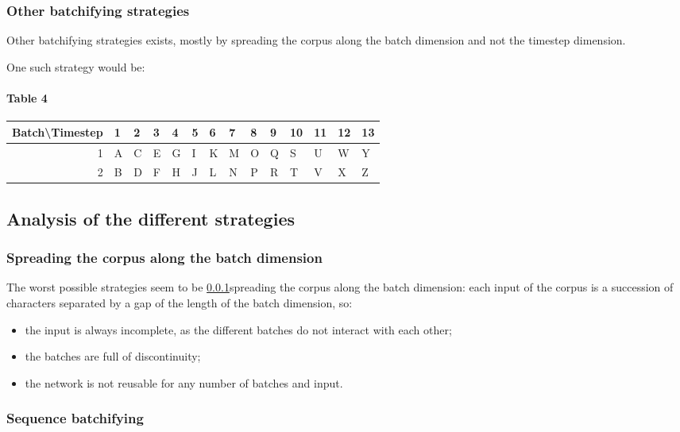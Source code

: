 \subsubsection{Other batchifying strategies}\label{table 4}

Other batchifying strategies exists, mostly by spreading the corpus along the batch dimension and not the timestep dimension.

One such strategy would be:

\paragraph{Table 4}
\begin{tabular}[]{|r|lllllllllllll|}
	\hline
	Batch\textbackslash Timestep & 1 & 2 & 3 & 4 & 5 & 6 & 7 & 8 & 9 & 10 & 11 & 12 &
	13\\
	\hline
	1 & A & C & E & G & I & K & M & O & Q & S & U & W & Y\\
	2 & B & D & F & H & J & L & N & P & R & T & V & X & Z\\
	\hline
\end{tabular}

\subsection{Analysis of the different
strategies}

\subsubsection{Spreading the corpus along the batch
dimension}

The worst possible strategies seem to be
\ref{table 4}{spreading
the corpus along the batch dimension}: each input of the corpus is a
succession of characters separated by a gap of the length of the batch
dimension, so:
\begin{itemize}
	\item the input is always incomplete, as the different batches do not interact with each other;
	\item the batches are full of discontinuity;
	\item the network is not reusable for any number of batches and input.
\end{itemize}

\subsubsection{Sequence batchifying}\label{sequence-batchifying}

